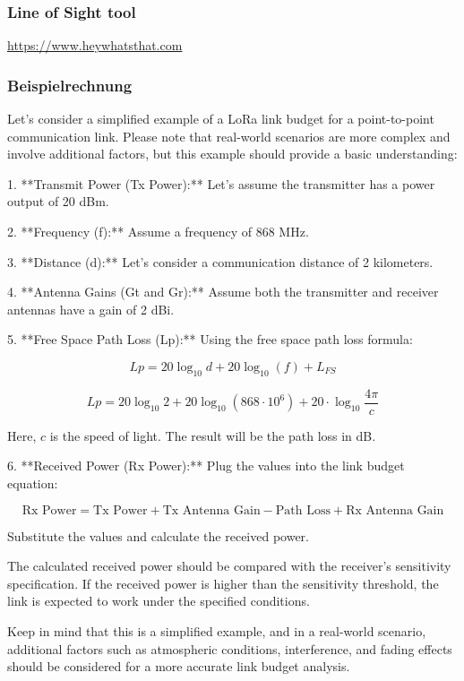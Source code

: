 \documentclass[12pt,a4paper]{article}
\begin{document}
\subsubsection{Line of Sight tool}

\url{https://www.heywhatsthat.com}
\newpage
\subsubsection{Beispielrechnung}

Let's consider a simplified example of a LoRa link budget for a point-to-point communication link. Please note that real-world scenarios are more complex and involve additional factors, but this example should provide a basic understanding:

1. **Transmit Power (Tx Power):** Let's assume the transmitter has a power output of 20 dBm.

2. **Frequency (f):** Assume a frequency of 868 MHz.

3. **Distance (d):** Let's consider a communication distance of 2 kilometers.

4. **Antenna Gains (Gt and Gr):** Assume both the transmitter and receiver antennas have a gain of 2 dBi.

5. **Free Space Path Loss (Lp):** Using the free space path loss formula:

   $$
   Lp = 20 \log_{10}{d} + 20 \log_{10}{(f)} + L_{FS}
   $$

   $$
   Lp = 20 \log_{10}{2} + 20 \log_{10}{(868 \cdot 10^6)} + 20 \cdot \log_{10}{\frac{4\pi}{c}}
   $$

   Here, \(c\) is the speed of light. The result will be the path loss in dB.

6. **Received Power (Rx Power):** Plug the values into the link budget equation:

   $$
   \text{Rx Power} = \text{Tx Power} + \text{Tx Antenna Gain} - \text{Path Loss} + \text{Rx Antenna Gain}
   $$

   Substitute the values and calculate the received power.

The calculated received power should be compared with the receiver's sensitivity specification. If the received power is higher than the sensitivity threshold, the link is expected to work under the specified conditions.

Keep in mind that this is a simplified example, and in a real-world scenario, additional factors such as atmospheric conditions, interference, and fading effects should be considered for a more accurate link budget analysis.
\end{document}
